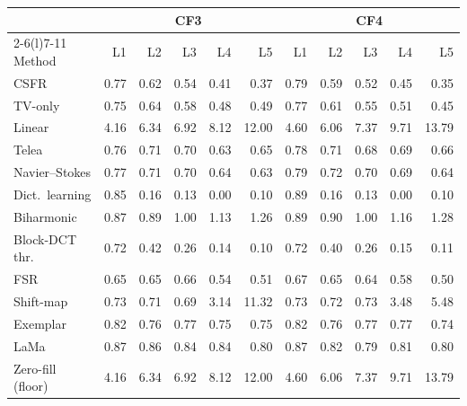 \documentclass[11pt]{article}
\begin{document}
\begin{table}[htbp]
\begin{tabular}{@{}l*{10}{r}@{}}
\end{tabular}
\par\medskip
\begin{tabular}{@{}l*{10}{r}@{}}
\toprule
 & \multicolumn{5}{c}{CF3} & \multicolumn{5}{c}{CF4} \\
\cmidrule(lr){2-6}\cmidrule(l){7-11}
Method & L1 & L2 & L3 & L4 & L5 & L1 & L2 & L3 & L4 & L5 \\
\midrule
CSFR & 0.77 & 0.62 & 0.54 & 0.41 & 0.37 & 0.79 & 0.59 & 0.52 & 0.45 & 0.35 \\
TV-only & 0.75 & 0.64 & 0.58 & 0.48 & 0.49 & 0.77 & 0.61 & 0.55 & 0.51 & 0.45 \\
Linear & 4.16 & 6.34 & 6.92 & 8.12 & 12.00 & 4.60 & 6.06 & 7.37 & 9.71 & 13.79 \\
Telea & 0.76 & 0.71 & 0.70 & 0.63 & 0.65 & 0.78 & 0.71 & 0.68 & 0.69 & 0.66 \\
Navier--Stokes & 0.77 & 0.71 & 0.70 & 0.64 & 0.63 & 0.79 & 0.72 & 0.70 & 0.69 & 0.64 \\
Dict.\ learning & 0.85 & 0.16 & 0.13 & 0.00 & 0.10 & 0.89 & 0.16 & 0.13 & 0.00 & 0.10 \\
Biharmonic & 0.87 & 0.89 & 1.00 & 1.13 & 1.26 & 0.89 & 0.90 & 1.00 & 1.16 & 1.28 \\
Block-DCT thr. & 0.72 & 0.42 & 0.26 & 0.14 & 0.10 & 0.72 & 0.40 & 0.26 & 0.15 & 0.11 \\
FSR & 0.65 & 0.65 & 0.66 & 0.54 & 0.51 & 0.67 & 0.65 & 0.64 & 0.58 & 0.50 \\
Shift-map & 0.73 & 0.71 & 0.69 & 3.14 & 11.32 & 0.73 & 0.72 & 0.73 & 3.48 & 5.48 \\
Exemplar & 0.82 & 0.76 & 0.77 & 0.75 & 0.75 & 0.82 & 0.76 & 0.77 & 0.77 & 0.74 \\
LaMa & 0.87 & 0.86 & 0.84 & 0.84 & 0.80 & 0.87 & 0.82 & 0.79 & 0.81 & 0.80 \\
\midrule
Zero-fill (floor) & 4.16 & 6.34 & 6.92 & 8.12 & 12.00 & 4.60 & 6.06 & 7.37 & 9.71 & 13.79 \\
\bottomrule
\end{tabular}
\end{table}
\end{document}
